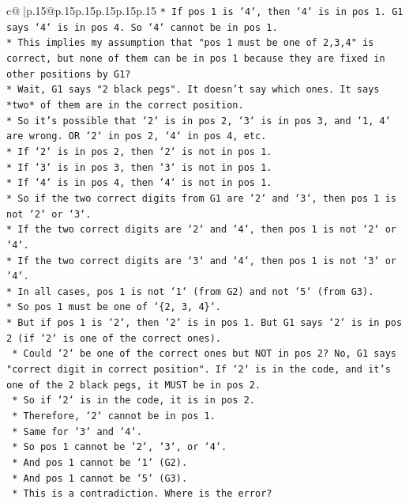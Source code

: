 \documentclass{article}
\begin{document}
{\begin{supertabular}{c@{$\;$}|p{.15\linewidth}@{}p{.15\linewidth}p{.15\linewidth}p{.15\linewidth}p{.15\linewidth}p{.15\linewidth}}
{{{\texttt{*   If pos 1 is `4`, then `4` is in pos 1. G1 says `4` is in pos 4. So `4` cannot be in pos 1.} \\
\texttt{*   This implies my assumption that "pos 1 must be one of 2,3,4" is correct, but none of them can be in pos 1 because they are fixed in other positions by G1?} \\
\texttt{*   Wait, G1 says "2 black pegs". It doesn't say which ones. It says *two* of them are in the correct position.} \\
\texttt{*   So it's possible that `2` is in pos 2, `3` is in pos 3, and `1, 4` are wrong. OR `2` in pos 2, `4` in pos 4, etc.} \\
\texttt{*   If `2` is in pos 2, then `2` is not in pos 1.} \\
\texttt{*   If `3` is in pos 3, then `3` is not in pos 1.} \\
\texttt{*   If `4` is in pos 4, then `4` is not in pos 1.} \\
\texttt{*   So if the two correct digits from G1 are `2` and `3`, then pos 1 is not `2` or `3`.} \\
\texttt{*   If the two correct digits are `2` and `4`, then pos 1 is not `2` or `4`.} \\
\texttt{*   If the two correct digits are `3` and `4`, then pos 1 is not `3` or `4`.} \\
\texttt{*   In all cases, pos 1 is not `1` (from G2) and not `5` (from G3).} \\
\texttt{*   So pos 1 must be one of `\{2, 3, 4\}`.} \\
\texttt{*   But if pos 1 is `2`, then `2` is in pos 1. But G1 says `2` is in pos 2 (if `2` is one of the correct ones).} \\
\texttt{    *   Could `2` be one of the correct ones but NOT in pos 2? No, G1 says "correct digit in correct position". If `2` is in the code, and it's one of the 2 black pegs, it MUST be in pos 2.} \\
\texttt{    *   So if `2` is in the code, it is in pos 2.} \\
\texttt{    *   Therefore, `2` cannot be in pos 1.} \\
\texttt{    *   Same for `3` and `4`.} \\
\texttt{    *   So pos 1 cannot be `2`, `3`, or `4`.} \\
\texttt{    *   And pos 1 cannot be `1` (G2).} \\
\texttt{    *   And pos 1 cannot be `5` (G3).} \\
\texttt{    *   This is a contradiction. Where is the error?} \\
}}}
\end{supertabular}}
\end{document}
